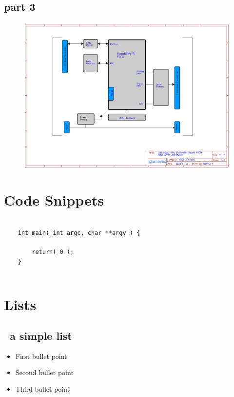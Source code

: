 \FloatBarrier

\subsection{part 3}
\begin{figure}[ht]
    \centering
    \includegraphics[page=3, width=\textwidth]{./schematics/Schematic_LcsNodes-Main-Controller-Board-B.01.00.pdf}
\end{figure}

\FloatBarrier


\section{Code Snippets}

\lstset{style=listingstyle}
\begin{lstlisting}

    int main( int argc, char **argv ) {

        return( 0 );
    }
    
\end{lstlisting}


\section{Lists}

\subsection{ a simple list}

\begin{itemize}
    \item First bullet point
    \item Second bullet point
    \item Third bullet point
\end{itemize}


